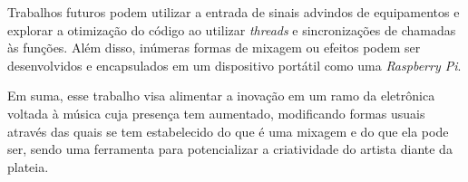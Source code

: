 Trabalhos futuros podem utilizar a entrada de sinais advindos de equipamentos e explorar a otimização do código ao utilizar \textit{threads} e sincronizações de chamadas às funções. Além disso, inúmeras formas de mixagem ou efeitos podem ser desenvolvidos e encapsulados em um dispositivo portátil como uma \textit{Raspberry Pi}.

Em suma, esse trabalho visa alimentar a inovação em um ramo da eletrônica voltada à música cuja presença tem aumentado, modificando formas usuais através das quais se tem estabelecido do que é uma mixagem e do que ela pode ser, sendo uma ferramenta para potencializar a criatividade do artista diante da plateia. 